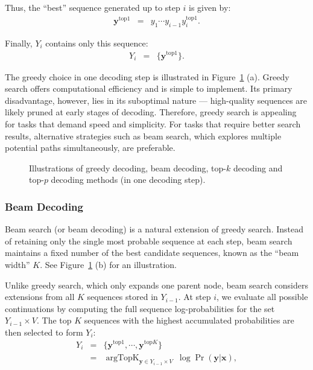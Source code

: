 Thus, the ``best'' sequence generated up to step $i$ is given by:
\begin{eqnarray}
\mathbf{y}^{\mathrm{top}1} & = & y_1\cdots y_{i-1} y_i^{\mathrm{top}1}.
\end{eqnarray}

Finally, $Y_i$ contains only this sequence:
\begin{eqnarray}
Y_i & = & \{\mathbf{y}^{\mathrm{top}1}\}.
\end{eqnarray}

The greedy choice in one decoding step is illustrated in Figure~\ref{fig:llm-decoding-methods} (a). Greedy search offers computational efficiency and is simple to implement. Its primary disadvantage, however, lies in its suboptimal nature --- high-quality sequences are likely pruned at early stages of decoding. Therefore, greedy search is appealing for tasks that demand speed and simplicity. For tasks that require better search results, alternative strategies such as beam search, which explores multiple potential paths simultaneously, are preferable.

\begin{figure}[!t]
\centering

\vspace{-0.5cm} \caption{Illustrations of greedy decoding, beam decoding, top-$k$ decoding and top-$p$ decoding methods (in one decoding step).}
\label{fig:llm-decoding-methods}
\end{figure}

\subsubsection{Beam Decoding}

Beam search (or beam decoding) is a natural extension of greedy search. Instead of retaining only the single most probable sequence at each step, beam search maintains a fixed number of the best candidate sequences, known as the ``beam width'' $K$. See Figure~\ref{fig:llm-decoding-methods} (b) for an illustration.

Unlike greedy search, which only expands one parent node, beam search considers extensions from all $K$ sequences stored in $Y_{i-1}$. At step $i$, we evaluate all possible continuations by computing the full sequence log-probabilities for the set $Y_{i-1} \times V$. The top $K$ sequences with the highest accumulated probabilities are then selected to form $Y_i$:
\begin{eqnarray}
Y_i & = & \{\mathbf{y}^{\mathrm{top}1},\cdots,\mathbf{y}^{\mathrm{top}K}\} \nonumber \\
    & = & \mathop{\mathrm{argTopK}}_{\mathbf{y} \in Y_{i-1} \times V}\ \log \Pr(\mathbf{y}|\mathbf{x}), \label{eq:llm-beam-search-k-best}
\end{eqnarray}

